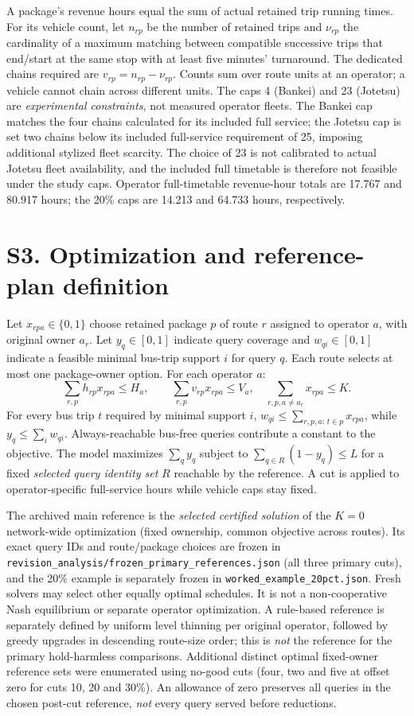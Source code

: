 \documentclass[10pt]{article}
\newcommand{\st}[1]{\texttt{\footnotesize #1}}
\begin{document}
A package's revenue hours equal the sum of actual retained trip running times. For its vehicle count, let $n_{rp}$ be the number of retained trips and $\nu_{rp}$ the cardinality of a maximum matching between compatible successive trips that end/start at the same stop with at least five minutes' turnaround. The dedicated chains required are $v_{rp}=n_{rp}-\nu_{rp}$. Counts sum over route units at an operator; a vehicle cannot chain across different units. The caps 4 (Bankei) and 23 (Jotetsu) are \emph{experimental constraints}, not measured operator fleets. The Bankei cap matches the four chains calculated for its included full service; the Jotetsu cap is set two chains below its included full-service requirement of 25, imposing additional stylized fleet scarcity. The choice of 23 is not calibrated to actual Jotetsu fleet availability, and the included full timetable is therefore not feasible under the study caps. Operator full-timetable revenue-hour totals are 17.767 and 80.917 hours; the 20\% caps are 14.213 and 64.733 hours, respectively.

\section*{S3. Optimization and reference-plan definition}
Let $x_{rpa}\in\{0,1\}$ choose retained package $p$ of route $r$ assigned to operator $a$, with original owner $a_r$. Let $y_q\in[0,1]$ indicate query coverage and $w_{qi}\in[0,1]$ indicate a feasible minimal bus-trip support $i$ for query $q$. Each route selects at most one package-owner option. For each operator $a$:
\[
\sum_{r,p}h_{rp}x_{rpa}\le H_a,\qquad \sum_{r,p}v_{rp}x_{rpa}\le V_a,
\quad\sum_{r,p,a\ne a_r}x_{rpa}\le K.
\]
For every bus trip $t$ required by minimal support $i$, $w_{qi}\le\sum_{r,p,a:\,t\in p}x_{rpa}$, while $y_q\le\sum_i w_{qi}$. Always-reachable bus-free queries contribute a constant to the objective. The model maximizes $\sum_q y_q$ subject to $\sum_{q\in R}(1-y_q)\le L$ for a fixed \emph{selected query identity set} $R$ reachable by the reference. A cut is applied to operator-specific full-service hours while vehicle caps stay fixed.

The archived main reference is the \emph{selected certified solution} of the $K=0$ network-wide optimization (fixed ownership, common objective across routes). Its exact query IDs and route/package choices are frozen in \st{revision\_analysis/frozen\_primary\_references.json} (all three primary cuts), and the 20\% example is separately frozen in \st{worked\_example\_20pct.json}. Fresh solvers may select other equally optimal schedules. It is not a non-cooperative Nash equilibrium or separate operator optimization. A rule-based reference is separately defined by uniform level thinning per original operator, followed by greedy upgrades in descending route-size order; this is \emph{not} the reference for the primary hold-harmless comparisons. Additional distinct optimal fixed-owner reference sets were enumerated using no-good cuts (four, two and five at offset zero for cuts 10, 20 and 30\%). An allowance of zero preserves all queries in the chosen post-cut reference, \emph{not} every query served before reductions.
\end{document}
